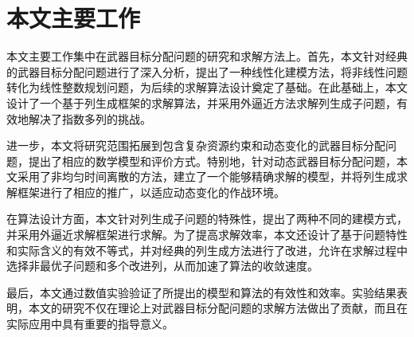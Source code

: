 \section{本文主要工作}
本文主要工作集中在武器目标分配问题的研究和求解方法上。首先，本文针对经典的武器目标分配问题进行了深入分析，提出了一种线性化建模方法，将非线性问题转化为线性整数规划问题，为后续的求解算法设计奠定了基础。在此基础上，本文设计了一个基于列生成框架的求解算法，并采用外逼近方法求解列生成子问题，有效地解决了指数多列的挑战。

进一步，本文将研究范围拓展到包含复杂资源约束和动态变化的武器目标分配问题，提出了相应的数学模型和评价方式。特别地，针对动态武器目标分配问题，本文采用了非均匀时间离散的方法，建立了一个能够精确求解的模型，并将列生成求解框架进行了相应的推广，以适应动态变化的作战环境。

在算法设计方面，本文针对列生成子问题的特殊性，提出了两种不同的建模方式，并采用外逼近求解框架进行求解。为了提高求解效率，本文还设计了基于问题特性和实际含义的有效不等式，并对经典的列生成方法进行了改进，允许在求解过程中选择非最优子问题和多个改进列，从而加速了算法的收敛速度。

最后，本文通过数值实验验证了所提出的模型和算法的有效性和效率。实验结果表明，本文的研究不仅在理论上对武器目标分配问题的求解方法做出了贡献，而且在实际应用中具有重要的指导意义。
